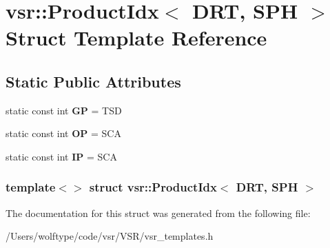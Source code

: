 \hypertarget{structvsr_1_1_product_idx_3_01_d_r_t_00_01_s_p_h_01_4}{\section{vsr\-:\-:Product\-Idx$<$ D\-R\-T, S\-P\-H $>$ Struct Template Reference}
\label{structvsr_1_1_product_idx_3_01_d_r_t_00_01_s_p_h_01_4}
}
\subsection*{Static Public Attributes}
\begin{DoxyCompactItemize}
\item 
\hypertarget{structvsr_1_1_product_idx_3_01_d_r_t_00_01_s_p_h_01_4_aa5a890347fd644d045bb21547a4e3fb6}{static const int {\bfseries G\-P} = T\-S\-D}\label{structvsr_1_1_product_idx_3_01_d_r_t_00_01_s_p_h_01_4_aa5a890347fd644d045bb21547a4e3fb6}

\item 
\hypertarget{structvsr_1_1_product_idx_3_01_d_r_t_00_01_s_p_h_01_4_a7df0f0b770c876638a19de44c63b8da9}{static const int {\bfseries O\-P} = S\-C\-A}\label{structvsr_1_1_product_idx_3_01_d_r_t_00_01_s_p_h_01_4_a7df0f0b770c876638a19de44c63b8da9}

\item 
\hypertarget{structvsr_1_1_product_idx_3_01_d_r_t_00_01_s_p_h_01_4_aa9a575a453a9da5f76176d681ac97304}{static const int {\bfseries I\-P} = S\-C\-A}\label{structvsr_1_1_product_idx_3_01_d_r_t_00_01_s_p_h_01_4_aa9a575a453a9da5f76176d681ac97304}

\end{DoxyCompactItemize}
\subsubsection*{template$<$$>$ struct vsr\-::\-Product\-Idx$<$ D\-R\-T, S\-P\-H $>$}



The documentation for this struct was generated from the following file\-:\begin{DoxyCompactItemize}
\item 
/\-Users/wolftype/code/vsr/\-V\-S\-R/vsr\-\_\-templates.\-h\end{DoxyCompactItemize}
